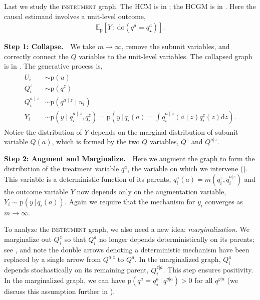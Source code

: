 \documentclass[12pt]{article}
\newcommand{\EE}[2]{\mathbb{E}_{#1}\left[ #2 \right]}
\newcommand{\rmdo}{\mathrm{do}}
\newcommand{\s}{\, ; \,}
\newcommand{\g}{\,\vert\,}
\newcommand{\di}{\mathrm{d}}
\newcommand{\pr}{\mathrm{p}}
\newcommand{\parheadsmall}[1]{\vspace{0.1in} \noindent \textbf{#1} \,\,}
\begin{document}
Last we study the \textsc{instrument} graph. The HCM is in
; the HCGM is in
.  Here the causal estimand involves a
unit-level outcome,
\begin{align}
  \label{eq:inst_estimand}
  \EE{\pr}{Y \s \rmdo(q^a = q^a_\star)}.
\end{align}

\parheadsmall{Step 1: Collapse.} We take $m \rightarrow \infty$, remove the
subunit variables, and correctly connect the $Q$ variables to the
unit-level variables. The collapsed graph is in
. The generative process is,
\begin{align}
  \label{eqn:instrument_collapse}
  \begin{split}
    U_i &\sim \pr(u)\\
    Q^z_i &\sim \pr(q^z)\\
    Q^{a \mid z}_i &\sim \pr(q^{a \mid z} \mid u_i)\\
    Y_i &\sim \pr(y \mid q^{a \mid z}_i, q^z_i) = \pr\left(y \, \Big|\, q_i(a) = \int q^{a \mid z}_i(a \mid z) q^z_i(z) \di z\right).
  \end{split}
\end{align}
Notice the distribution of $Y$ depends on the marginal distribution of
subunit variable $Q(a)$, which is formed by the two $Q$ variables,
$Q^{z}$ and $Q^{a|z}$.

\parheadsmall{Step 2: Augment and Marginalize.} Here we augment the
graph to form the distribution of the treatment variable $q^a$, the
variable on which we intervene (). This variable is a deterministic
function of its parents, $q_i^a(a) = m(q_i^z, q_i^{a|z})$ and the
outcome variable $Y$ now depends only on the augmentation variable,
$Y_i \sim \pr(y \g q_i(a))$. Again we require that the mechanism for $y_i$
converges as $m \rightarrow \infty$.



To analyze the \textsc{instrument} graph, we also need a new idea:
\textit{marginalization}.  We marginalize out $Q_i^z$ so that $Q_i^a$ no longer
depends deterministically on its parents; see
, and note the double arrows denoting a deterministic mechanism have been replaced by a single arrow from $Q^{a|z}$ to $Q^a$.  In the marginalized graph, $Q_i^a$
depends stochastically on its remaining parent, $Q_i^{z|a}$. This step
ensures positivity. In the marginalized graph, we can have
$\pr(q^a = q^a_\star \g q^{y|a}) > 0$ for all $q^{y|a}$ (we discuss this assumption further in ).
\end{document}
